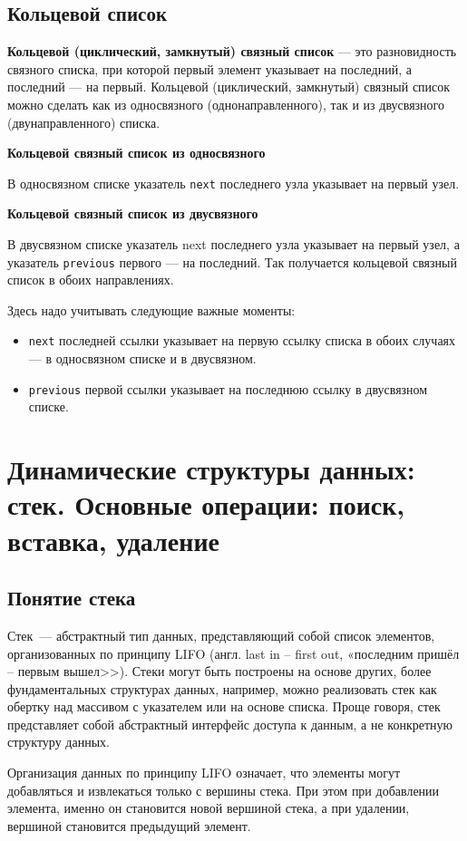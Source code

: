 \subsection{Кольцевой список}

\textbf{Кольцевой (циклический, замкнутый) связный список} — это разновидность связного списка, при которой первый элемент указывает на последний, а последний — на первый. Кольцевой (циклический, замкнутый) связный список можно сделать как из односвязного (однонаправленного), так и из двусвязного (двунаправленного) списка.

\textbf{Кольцевой связный список из односвязного}

В односвязном списке указатель \texttt{next} последнего узла указывает на первый узел.

\textbf{Кольцевой связный список из двусвязного}

В двусвязном списке указатель next последнего узла указывает на первый узел, а указатель \texttt{previous} первого — на последний. Так получается кольцевой связный список в обоих направлениях.

Здесь надо учитывать следующие важные моменты:
\begin{itemize}
    \item \texttt{next} последней ссылки указывает на первую ссылку списка в обоих случаях — в односвязном списке и в двусвязном.
    \item \texttt{previous} первой ссылки указывает на последнюю ссылку в двусвязном списке.
\end{itemize}

\section{Динамические структуры данных: стек. Основные операции: поиск, вставка, удаление}
\subsection{Понятие стека}
Стек~--- абстрактный тип данных, представляющий собой список элементов, организованных по принципу
LIFO (англ. last in -- first out, «последним пришёл -- первым вышел>>). Стеки могут быть построены на основе других, более фундаментальных
структурах данных, например, можно реализовать стек как обертку над массивом с указателем или на основе списка. Проще говоря, стек представляет
собой абстрактный интерфейс доступа к данным, а не конкретную структуру данных.

Организация данных по принципу LIFO означает, что элементы могут добавляться и извлекаться только с вершины стека. При этом при добавлении
элемента, именно он становится новой вершиной стека, а при удалении, вершиной становится предыдущий элемент.

